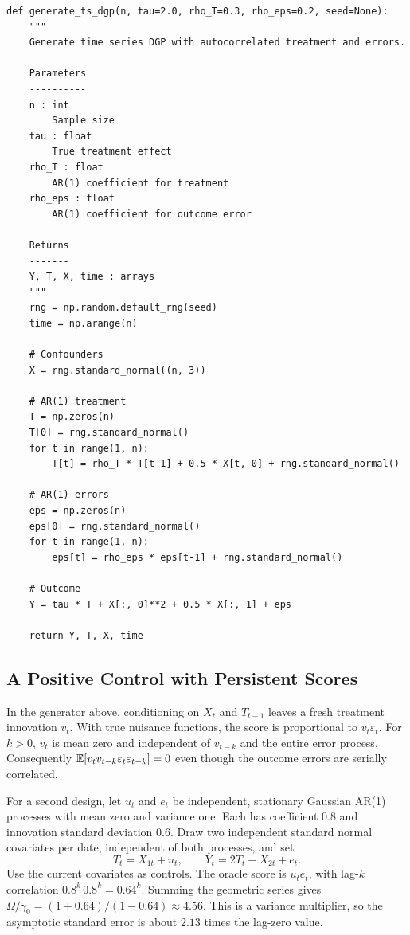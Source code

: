 \begin{verbatim}
def generate_ts_dgp(n, tau=2.0, rho_T=0.3, rho_eps=0.2, seed=None):
    """
    Generate time series DGP with autocorrelated treatment and errors.

    Parameters
    ----------
    n : int
        Sample size
    tau : float
        True treatment effect
    rho_T : float
        AR(1) coefficient for treatment
    rho_eps : float
        AR(1) coefficient for outcome error

    Returns
    -------
    Y, T, X, time : arrays
    """
    rng = np.random.default_rng(seed)
    time = np.arange(n)

    # Confounders
    X = rng.standard_normal((n, 3))

    # AR(1) treatment
    T = np.zeros(n)
    T[0] = rng.standard_normal()
    for t in range(1, n):
        T[t] = rho_T * T[t-1] + 0.5 * X[t, 0] + rng.standard_normal()

    # AR(1) errors
    eps = np.zeros(n)
    eps[0] = rng.standard_normal()
    for t in range(1, n):
        eps[t] = rho_eps * eps[t-1] + rng.standard_normal()

    # Outcome
    Y = tau * T + X[:, 0]**2 + 0.5 * X[:, 1] + eps

    return Y, T, X, time
\end{verbatim}

\subsection{A Positive Control with Persistent Scores}

In the generator above, conditioning on $X_t$ and $T_{t-1}$ leaves a fresh treatment innovation $v_t$. With true nuisance functions, the score is proportional to $v_t\varepsilon_t$. For $k>0$, $v_t$ is mean zero and independent of $v_{t-k}$ and the entire error process. Consequently $\mathbb{E}[v_t v_{t-k}\varepsilon_t\varepsilon_{t-k}]=0$ even though the outcome errors are serially correlated.

For a second design, let $u_t$ and $e_t$ be independent, stationary Gaussian AR(1) processes with mean zero and variance one. Each has coefficient 0.8 and innovation standard deviation 0.6. Draw two independent standard normal covariates per date, independent of both processes, and set
\[
    T_t=X_{1t}+u_t, \qquad Y_t=2T_t+X_{2t}+e_t.
\]
Use the current covariates as controls. The oracle score is $u_t e_t$, with lag-$k$ correlation $0.8^k\,0.8^k=0.64^k$. Summing the geometric series gives $\Omega/\gamma_0=(1+0.64)/(1-0.64)\approx 4.56$. This is a variance multiplier, so the asymptotic standard error is about $2.13$ times the lag-zero value.

